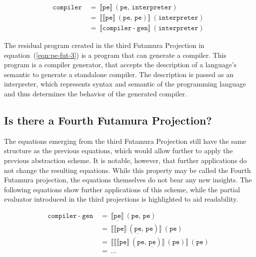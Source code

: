 \begin{align}
  \mathtt{compiler}\
  &=\ \llbracket \mathtt{pe} \rrbracket \ (\mathtt{pe},\, \mathtt{interpreter}) \\
  &=\ \llbracket \llbracket \mathtt{pe} \rrbracket \ (\mathtt{pe},\, \mathtt{pe}) \rrbracket \ (\mathtt{interpreter}) \label{eqn:pe-fut-3}\\
  &=\ \llbracket \mathtt{compiler\operatorname{-}gen} \rrbracket \ (\mathtt{interpreter})
\end{align}

The residual program created in the third Futamura Projection in equation~(\ref{eqn:pe-fut-3}) is a program that can generate a compiler.
This program is a compiler generator, that accepts the description of a language's semantic to generate a standalone compiler.
The description is passed as an interpreter, which represents syntax and semantic of the programming language and thus determines the behavior of the generated compiler.


\subsection{Is there a Fourth Futamura Projection?}\label{sec:futamura-fourth}

The equations emerging from the third Futamura Projection still have the same structure as the previous equations, which would allow further to apply the previous abstraction scheme.
It is notable, however, that further applications do not change the resulting equations.
While this property may be called the Fourth Futamura projection, the equations themselves do not bear any new insights.
The following equations show further applications of this scheme, while the partial evaluator introduced in the third projections is highlighted to aid readability.

\begin{align}
  \mathtt{compiler\operatorname{-}gen}\
  &=\ \llbracket \mathtt{\underline{pe}} \rrbracket \ (\mathtt{pe},\, \mathtt{pe}) \\
  &=\ \llbracket \llbracket \mathtt{pe} \rrbracket \ (\mathtt{\underline{pe}},\, \mathtt{pe}) \rrbracket \ (\mathtt{pe}) \\
  &=\ \llbracket \llbracket \llbracket \mathtt{pe} \rrbracket\ (\mathtt{pe},\, \mathtt{\underline{pe}}) \rrbracket \ (\mathtt{pe}) \rrbracket \ (\mathtt{pe}) \\
  &=\ \ldots \nonumber
\end{align}



